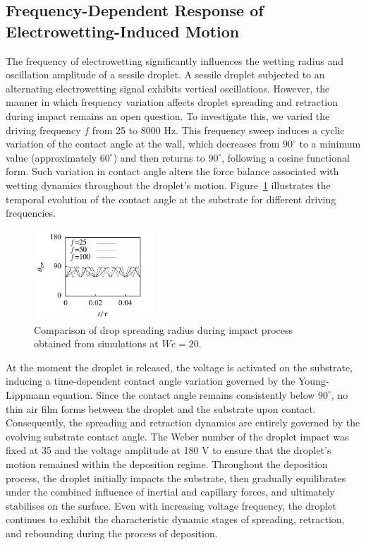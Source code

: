 \documentclass[lineno]{cls/jfm}
\begin{document}
 

\subsection{Frequency-Dependent Response of Electrowetting-Induced Motion}

 The frequency of electrowetting significantly influences the wetting radius and oscillation amplitude of a sessile droplet. A sessile droplet subjected to an alternating electrowetting signal exhibits vertical oscillations. However, the manner in which frequency variation affects droplet spreading and retraction during impact remains an open question. To investigate this, we varied the driving frequency $f$ from 25 to 8000 Hz. This frequency sweep induces a cyclic variation of the contact angle at the wall, which decreases from $90^\circ$ to a minimum value (approximately $60^\circ$) and then returns to $90^\circ$, following a cosine functional form. Such variation in contact angle alters the force balance associated with wetting dynamics throughout the droplet's motion. Figure~\ref{fig:freq} illustrates the temporal evolution of the contact angle at the substrate for different driving frequencies.

 \begin{figure}
  \centerline{\includegraphics[width=0.4\textwidth]{fig/Freq.pdf}}
  \caption{Comparison of drop spreading radius during impact process obtained from simulations at $We=20$.}
 \label{fig:freq}
 \end{figure}

 At the moment the droplet is released, the voltage is activated on the substrate, inducing a time-dependent contact angle variation governed by the Young-Lippmann equation. Since the contact angle remains consistently below $90^\circ$, no thin air film forms between the droplet and the substrate upon contact. Consequently, the spreading and retraction dynamics are entirely governed by the evolving substrate contact angle. The Weber number of the droplet impact was fixed at 35 and the voltage amplitude at 180 V to ensure that the droplet's motion remained within the deposition regime. Throughout the deposition process, the droplet initially impacts the substrate, then gradually equilibrates under the combined influence of inertial and capillary forces, and ultimately stabilises on the surface. Even with increasing voltage frequency, the droplet continues to exhibit the characteristic dynamic stages of spreading, retraction, and rebounding during the process of deposition.
\end{document}
